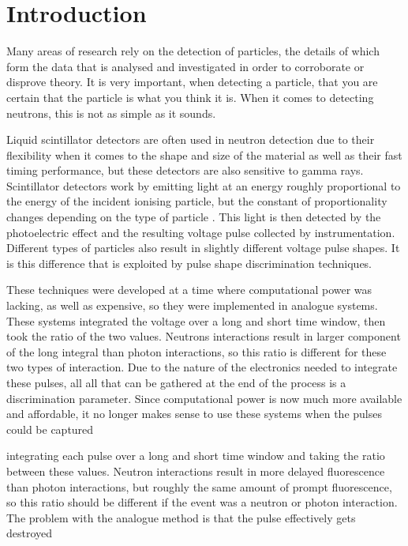 \documentclass[11pt]{article}
\numberwithin{equation}{section}
\numberwithin{figure}{section}
\numberwithin{table}{section}
\begin{document}
\section{Introduction}\label{sec:Introduction}
\par Many areas of research rely on the detection of particles, the details of which form the data that is analysed and investigated in order to corroborate or disprove theory. It is very important, when detecting a particle, that you are certain that the particle is what you think it is. When it comes to detecting neutrons, this is not as simple as it sounds. %
\par Liquid scintillator detectors are often used in neutron detection due to their flexibility when it comes to the shape and size of the material as well as their fast timing performance, but these detectors are also sensitive to gamma rays. Scintillator detectors work by emitting light at an energy roughly proportional to the energy of the incident ionising particle, but the constant of proportionality changes depending on the type of particle \cite{Knoll}. This light is then detected by the photoelectric effect and the resulting voltage pulse collected by instrumentation. Different types of particles also result in slightly different voltage pulse shapes. It is this difference that is exploited by pulse shape discrimination techniques. 
\par These techniques were developed at a time where computational power was lacking, as well as expensive, so they were implemented in analogue systems. These systems integrated the voltage over a long and short time window, then took the ratio of the two values. Neutrons interactions result in larger component of the long integral than photon interactions, so this ratio is different for these two types of interaction. Due to the nature of the electronics needed to integrate these pulses, all all that can be gathered at the end of the process is a discrimination parameter. Since computational power is now much more available and affordable, it no longer makes sense to use these systems when the pulses could be captured

integrating each pulse over a long and short time window and taking the ratio between these values. Neutron interactions result in more delayed fluorescence than photon interactions, but roughly the same amount of prompt fluorescence, so this ratio should be different if the event was a neutron or photon interaction. The problem with the analogue method is that the pulse effectively gets destroyed
\end{document}
